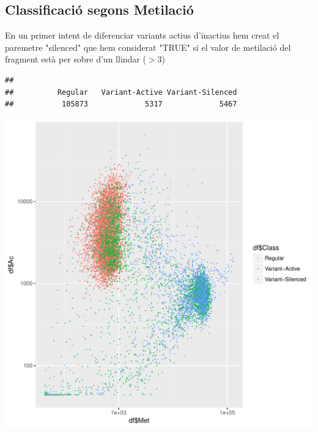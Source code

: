 \documentclass{article}\usepackage[]{graphicx}\usepackage[]{color}
\makeatletter
\newenvironment{kframe}{%
 \def\at@end@of@kframe{}%
 \ifinner\ifhmode%
  \def\at@end@of@kframe{\end{minipage}}%
  \begin{minipage}{\columnwidth}%
 \fi\fi%
 \def\FrameCommand##1{\hskip\@totalleftmargin \hskip-\fboxsep
 \colorbox{shadecolor}{##1}\hskip-\fboxsep
     \hskip-\linewidth \hskip-\@totalleftmargin \hskip\columnwidth}%
 \MakeFramed {\advance\hsize-\width
   \@totalleftmargin\z@ \linewidth\hsize
   \@setminipage}}%
 {\par\unskip\endMakeFramed%
 \at@end@of@kframe}
\newenvironment{knitrout}{}{} %
\makeatother
\begin{document}
\subsection{Classificació segons Metilació}
En un primer intent de diferenciar variants actius d'inactius hem creat el paremetre "silenced" que hem considerat "TRUE" si el valor de metilació del fragment està per sobre d'un llindar ($>$3)
\begin{knitrout}
\color{fgcolor}\begin{kframe}
\begin{verbatim}
## 
##          Regular   Variant-Active Variant-Silenced 
##           105873             5317             5467
\end{verbatim}
\end{kframe}

{\centering \includegraphics[width=1\linewidth]{figure/minimal-ac_met_log_status-1} 

}



\end{knitrout}
\clearpage
\end{document}
